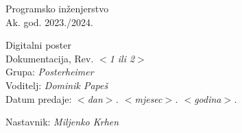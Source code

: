 \documentclass[12pt]{report}
\begin{document}
 
	
	
	
	\begin{titlepage}
		\begin{center}
			\LARGE Programsko inženjerstvo\\
			\large Ak. god. 2023./2024.\\
			
			
			\huge Digitalni poster\\
			\Large Dokumentacija, Rev. \textit{$<$1 ili 2$>$}\\
			
			\normalsize
			Grupa: \textit{Posterheimer}\\
			Voditelj: \textit{Dominik Papeš}\\
			
			
			Datum predaje: \textit{$<$dan$>$. $<$mjesec$>$. $<$godina$>$.}\\
	
			
			Nastavnik: \textit{Miljenko Krhen}\\
		
		\end{center}

	
	\end{titlepage}

	
	\tableofcontents


	
	
	
	
	
	
	
	
	
	\begingroup
	\renewcommand*\listfigurename{Indeks slika i dijagrama}
	\listoffigures
	\endgroup


	
	\eject 
		
	
\end{document}
